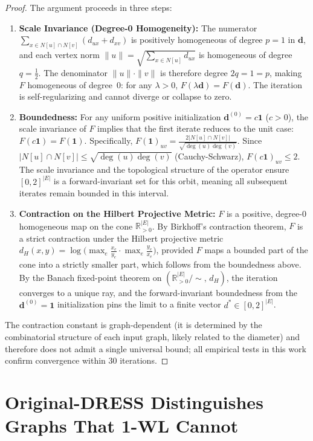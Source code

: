 \documentclass[11pt,a4paper]{article}
\begin{document}
\begin{proof}
The argument proceeds in three steps:
\begin{enumerate}
    \item \textbf{Scale Invariance (Degree-0 Homogeneity):} The numerator $\sum_{x \in N[u] \cap N[v]} (d_{ux} + d_{xv})$ is positively homogeneous of degree $p = 1$ in $\mathbf{d}$, and each vertex norm $\|u\| = \sqrt{\sum_{x \in N[u]} d_{ux}}$ is homogeneous of degree $q = \tfrac{1}{2}$. The denominator $\|u\| \cdot \|v\|$ is therefore degree $2q = 1 = p$, making $F$ homogeneous of degree~$0$: for any $\lambda > 0$, $F(\lambda \mathbf{d}) = F(\mathbf{d})$. The iteration is self-regularizing and cannot diverge or collapse to zero.
    \item \textbf{Boundedness:} For any uniform positive initialization $\mathbf{d}^{(0)} = c\mathbf{1}$ ($c>0$), the scale invariance of $F$ implies that the first iterate reduces to the unit case: $F(c\mathbf{1}) = F(\mathbf{1})$. Specifically, $F(\mathbf{1})_{uv} = \frac{2|N[u] \cap N[v]|}{\sqrt{\deg(u)\deg(v)}}$. Since $|N[u] \cap N[v]| \le \sqrt{\deg(u)\deg(v)}$ (Cauchy-Schwarz), $F(c\mathbf{1})_{uv} \le 2$. The scale invariance and the topological structure of the operator ensure $[0, 2]^{|E|}$ is a forward-invariant set for this orbit, meaning all subsequent iterates remain bounded in this interval.
    \item \textbf{Contraction on the Hilbert Projective Metric:} $F$ is a positive, degree-0 homogeneous map on the cone $\mathbb{R}_{>0}^{|E|}$. By Birkhoff's contraction theorem, $F$ is a strict contraction under the Hilbert projective metric $d_H(x, y) = \log\!\bigl(\max_e \frac{x_e}{y_e} \cdot \max_e \frac{y_e}{x_e}\bigr)$, provided $F$ maps a bounded part of the cone into a strictly smaller part, which follows from the boundedness above. By the Banach fixed-point theorem on $(\mathbb{R}_{>0}^{|E|}/{\sim},\, d_H)$, the iteration converges to a unique ray, and the forward-invariant boundedness from the $\mathbf{d}^{(0)} = \mathbf{1}$ initialization pins the limit to a finite vector $d^* \in [0, 2]^{|E|}$.
\end{enumerate}
The contraction constant is graph-dependent (it is determined by the combinatorial structure of each input graph, likely related to the diameter) and therefore does not admit a single universal bound; all empirical tests in this work confirm convergence within 30 iterations.
\end{proof}

\section{Original-DRESS Distinguishes Graphs That 1-WL Cannot}
\end{document}
